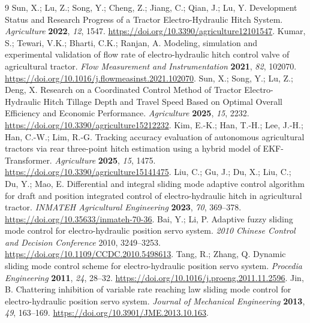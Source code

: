 \documentclass[agriengineering,article,submit,moreauthors]{Definitions/mdpi}
\begin{document}
\begin{thebibliography}{9}
 Sun, X.; Lu, Z.; Song, Y.; Cheng, Z.; Jiang, C.; Qian, J.; Lu, Y. Development Status and Research Progress of a Tractor Electro-Hydraulic Hitch System. \emph{Agriculture} \textbf{2022}, \emph{12}, 1547. \url{https://doi.org/10.3390/agriculture12101547}.
 Kumar, S.; Tewari, V.K.; Bharti, C.K.; Ranjan, A. Modeling, simulation and experimental validation of flow rate of electro-hydraulic hitch control valve of agricultural tractor. \emph{Flow Measurement and Instrumentation} \textbf{2021}, \emph{82}, 102070. \url{https://doi.org/10.1016/j.flowmeasinst.2021.102070}.
 Sun, X.; Song, Y.; Lu, Z.; Deng, X. Research on a Coordinated Control Method of Tractor Electro-Hydraulic Hitch Tillage Depth and Travel Speed Based on Optimal Overall Efficiency and Economic Performance. \emph{Agriculture} \textbf{2025}, \emph{15}, 2232. \url{https://doi.org/10.3390/agriculture15212232}.
 Kim, E.-K.; Han, T.-H.; Lee, J.-H.; Han, C.-W.; Lim, R.-G. Tracking accuracy evaluation of autonomous agricultural tractors via rear three-point hitch estimation using a hybrid model of EKF-Transformer. \emph{Agriculture} \textbf{2025}, \emph{15}, 1475. \url{https://doi.org/10.3390/agriculture15141475}.
 Liu, C.; Gu, J.; Du, X.; Liu, C.; Du, Y.; Mao, E. Differential and integral sliding mode adaptive control algorithm for draft and position integrated control of electro-hydraulic hitch in agricultural tractor. \emph{INMATEH Agricultural Engineering} \textbf{2023}, \emph{70}, 369--378. \url{https://doi.org/10.35633/inmateh-70-36}.
 Bai, Y.; Li, P. Adaptive fuzzy sliding mode control for electro-hydraulic position servo system. \emph{2010 Chinese Control and Decision Conference} 2010, 3249--3253. \url{https://doi.org/10.1109/CCDC.2010.5498613}.
 Tang, R.; Zhang, Q. Dynamic sliding mode control scheme for electro-hydraulic position servo system. \emph{Procedia Engineering} \textbf{2011}, \emph{24}, 28--32. \url{https://doi.org/10.1016/j.proeng.2011.11.2596}.
 Jin, B. Chattering inhibition of variable rate reaching law sliding mode control for electro-hydraulic position servo system. \emph{Journal of Mechanical Engineering} \textbf{2013}, \emph{49}, 163--169. \url{https://doi.org/10.3901/JME.2013.10.163}.
\end{thebibliography}
\end{document}
